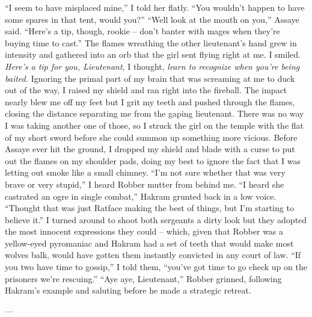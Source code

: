 \documentclass[12pt, openany]{book}
\begin{document}
“I seem to have misplaced mine,” I told her flatly. “You wouldn’t happen to have some spares in that tent, would you?”
“Well look at the mouth on you,” Assaye said. “Here’s a tip, though, rookie – don’t banter with mages when they’re buying time to cast.”
The flames wreathing the other lieutenant’s hand grew in intensity and gathered into an orb that the girl sent flying right at me. I smiled. \textit{Here’s a tip for you, Lieutenant}, I thought, \textit{learn to recognize when you’re being baited.} Ignoring the primal part of my brain that was screaming at me to duck out of the way, I raised my shield and ran right into the fireball. The impact nearly blew me off my feet but I grit my teeth and pushed through the flames, closing the distance separating me from the gaping lieutenant. There was no way I was taking another one of those, so I struck the girl on the temple with the flat of my short sword before she could summon up something more vicious. Before Assaye ever hit the ground, I dropped my shield and blade with a curse to put out the flames on my shoulder pads, doing my best to ignore the fact that I was letting out smoke like a small chimney.
“I’m not sure whether that was very brave or very stupid,” I heard Robber mutter from behind me.
“I heard she castrated an ogre in single combat,” Hakram grunted back in a low voice. “Thought that was just Ratface making the best of things, but I’m starting to believe it.”
I turned around to shoot both sergeants a dirty look but they adopted the most innocent expressions they could – which, given that Robber was a yellow-eyed pyromaniac and Hakram had a set of teeth that would make most wolves balk, would have gotten them instantly convicted in any court of law.
“If you two have time to gossip,” I told them, “you’ve got time to go check up on the prisoners we’re rescuing.”
“Aye aye, Lieutenant,” Robber grinned, following Hakram’s example and saluting before he made a strategic retreat.

—
\end{document}
